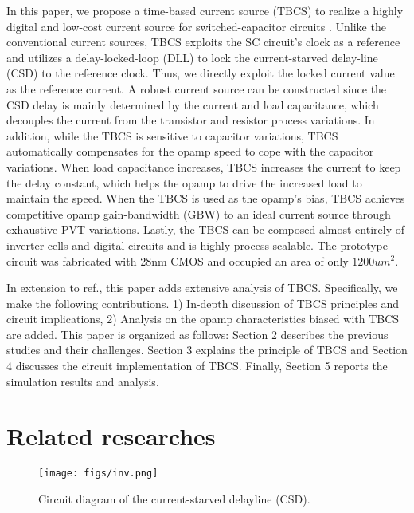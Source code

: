 \documentclass[paper]{ieice}
\begin{document}
In this paper, we propose a time-based current source (TBCS) to realize a highly digital and low-cost current source for switched-capacitor circuits \cite{yoshioka201728}. Unlike the conventional current sources, TBCS exploits the SC circuit's clock as a reference and utilizes a delay-locked-loop (DLL) to lock the current-starved delay-line (CSD) to the reference clock. Thus, we directly exploit the locked current value as the reference current. 
A robust current source can be constructed since the CSD delay is mainly determined by the current and load capacitance, which decouples the current from the transistor and resistor process variations. In addition, while the TBCS is sensitive to capacitor variations, TBCS automatically compensates for the opamp speed to cope with the capacitor variations. 
When load capacitance increases, TBCS increases the current to keep the delay constant, which helps the opamp to drive the increased load to maintain the speed. When the TBCS is used as the opamp's bias, TBCS achieves competitive opamp gain-bandwidth (GBW) to an ideal current source through exhaustive PVT variations.
Lastly, the TBCS can be composed almost entirely of inverter cells and digital circuits and is highly process-scalable. The prototype circuit was fabricated with 28nm CMOS and occupied an area of only $1200um^2$.

In extension to ref.\cite{yoshioka201728, yoshioka2019digital}, this paper adds extensive analysis of TBCS. Specifically, we make the following contributions. 1) In-depth discussion of TBCS principles and circuit implications, 2) Analysis on the opamp characteristics biased with TBCS are added.
This paper is organized as follows: Section 2 describes the previous studies and their challenges. Section 3 explains the principle of TBCS and Section 4 discusses the circuit implementation of TBCS. Finally, Section 5 reports the simulation results and analysis.

\section{Related researches}


\begin{figure}[!t]
\centering
 \texttt{[image: figs/inv.png]}
  \caption{Circuit diagram of the current-starved delayline (CSD).}
\label{inv}
\end{figure}
\end{document}
